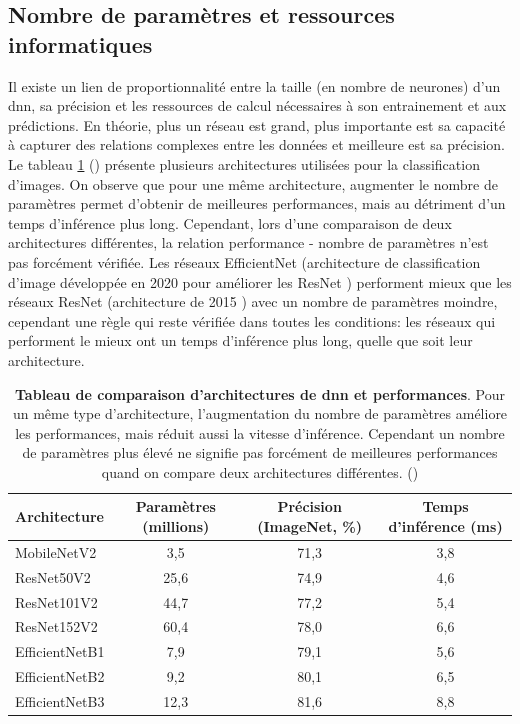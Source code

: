 \subsection{Nombre de paramètres et ressources informatiques}
Il existe un lien de proportionnalité entre la taille (en nombre de neurones) d'un \gls{dnn}, sa précision et les ressources de calcul nécessaires à son entrainement et aux prédictions. En théorie, plus un réseau est grand, plus importante est sa capacité à capturer des relations complexes entre les données et meilleure est sa précision. Le tableau \ref{table:dnn-size} (\cite{chollet_keras_2023}) présente plusieurs architectures utilisées pour la classification d'images. On observe que pour une même architecture, augmenter le nombre de paramètres permet d'obtenir de meilleures performances, mais au détriment d'un temps d'inférence plus long. Cependant, lors d'une comparaison de deux architectures différentes, la relation performance - nombre de paramètres n'est pas forcément vérifiée. Les réseaux EfficientNet (architecture de classification d'image développée en 2020 pour améliorer les ResNet \cite{tan_efficientnet_2020}) performent mieux que les réseaux ResNet (architecture de 2015 \cite{he_deep_2015}) avec un nombre de paramètres moindre, cependant une règle qui reste vérifiée dans toutes les conditions: les réseaux qui performent le mieux ont un temps d'inférence plus long, quelle que soit leur architecture.

\begin{table}[!ht]
\centering
\begin{tabular}{|l|c|c|c|} 
 \hline
 Architecture & Paramètres (millions) & Précision (ImageNet, \%) & Temps d'inférence (ms) \\
 \hline
MobileNetV2 & 3,5 & 71,3 & 3,8 \\
\hline
ResNet50V2 & 25,6 & 74,9 & 4,6 \\ 
ResNet101V2 & 44,7 & 77,2 & 5,4 \\ 
ResNet152V2 & 60,4 & 78,0 & 6,6 \\
\hline
EfficientNetB1 & 7,9 & 79,1 & 5,6 \\
EfficientNetB2 & 9,2 & 80,1& 6,5 \\
EfficientNetB3 & 12,3 & 81,6 & 8,8 \\
 \hline
\end{tabular}
\caption[Tableau de comparaison d'architectures de \gls{dnn} et performances]{\textbf{Tableau de comparaison d'architectures de \gls{dnn} et performances}. Pour un même type d'architecture, l'augmentation du nombre de paramètres améliore les performances, mais réduit aussi la vitesse d'inférence. Cependant un nombre de paramètres plus élevé ne signifie pas forcément de meilleures performances quand on compare deux architectures différentes. (\cite{chollet_keras_2023})} 
\label{table:dnn-size}
\end{table}

